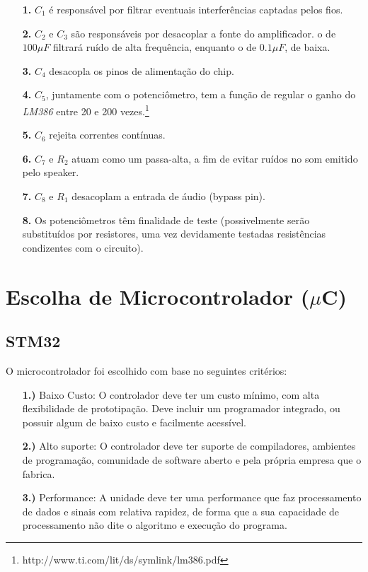\documentclass[11pt,a4paper]{report}
\begin{document}
	\begin{itemize}
		\item[{\bf 1.}]$C_1$ é responsável por filtrar eventuais interferências captadas pelos fios.
		\item[{\bf 2.}]$C_2$ e $C_3$ são responsáveis por desacoplar a fonte do amplificador. o de $100\mu{F}$ filtrará ruído de alta frequência, enquanto o de $0.1\mu{F}$, de baixa.
		\item[{\bf 3.}]$C_4$ desacopla os pinos de alimentação do chip.
		\item[{\bf 4.}]$C_5$, juntamente com o potenciômetro, tem a função de regular o ganho do {\it LM386} entre 20 e 200 vezes.\footnote{http://www.ti.com/lit/ds/symlink/lm386.pdf}
		\item[{\bf 5.}]$C_6$ rejeita correntes contínuas.
		\item[{\bf 6.}]$C_7$ e $R_2$ atuam como um passa-alta, a fim de evitar ruídos no som emitido pelo speaker.
		\item[{\bf 7.}]$C_8$ e $R_1$ desacoplam a entrada de áudio (bypass pin).
		\item[{\bf 8.}]Os potenciômetros têm finalidade de teste (possivelmente serão substituídos por resistores, uma vez devidamente testadas resistências condizentes com o circuito).
	\end{itemize}

\section{Escolha de Microcontrolador ($\mu$C)}
	\subsection{STM32}
	O microcontrolador foi escolhido com base no seguintes critérios:
	
	\begin{itemize}
		\item[{\bf 1.)}]Baixo Custo: O controlador deve ter um custo mínimo, com alta flexibilidade de prototipação. Deve incluir um programador integrado, ou possuir algum de baixo custo e facilmente acessível.
		
		\item[{\bf 2.)}]Alto suporte: O controlador deve ter suporte de compiladores, ambientes de programação, comunidade de software aberto e pela própria empresa que o fabrica.
		
		\item[{\bf 3.)}]Performance: A unidade deve ter uma performance que faz processamento de dados e sinais com relativa rapidez, de forma que a sua capacidade de processamento não dite o algoritmo e execução do programa.
	
	\end{itemize}
\end{document}
